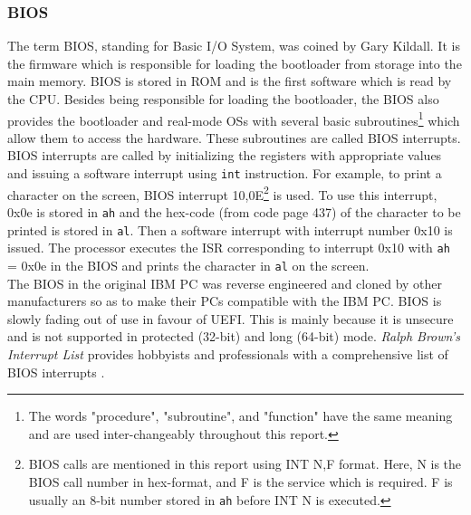 \subsubsection{BIOS}
The term BIOS, standing for Basic I/O System, was coined by Gary Kildall. It is the firmware which is responsible for loading the bootloader from storage into the main memory. BIOS is stored in ROM and is the first software which is read by the CPU. Besides being responsible for loading the bootloader, the BIOS also provides the bootloader and real-mode OSs with several basic subroutines\footnote[1]{The words "procedure", "subroutine", and "function" have the same meaning and are used inter-changeably throughout this report.} which allow them to access the hardware.  These subroutines are called BIOS interrupts. BIOS interrupts are called by initializing the registers with appropriate values and issuing a software interrupt using \verb|int| instruction. For example, to print a character on the screen, BIOS interrupt 10,0E\footnote[1]{BIOS calls are mentioned in this report using INT N,F format. Here, N is the BIOS call number in hex-format, and F is the service which is required. F is usually an 8-bit number stored in \texttt{ah} before INT N is executed.} is used. To use this interrupt, 0x0e is stored in \texttt{ah} and the hex-code (from code page 437) of the character to be printed is stored in \texttt{al}. Then a software interrupt with interrupt number 0x10 is issued. The processor executes the ISR corresponding to interrupt 0x10 with \texttt{ah} = 0x0e in the BIOS and prints the character in \texttt{al} on the screen.\\
The BIOS in the original IBM PC was reverse engineered and cloned by other manufacturers so as to make their PCs compatible with the IBM PC. BIOS is slowly fading out of use in favour of UEFI. This is mainly because it is unsecure and is not supported in protected (32-bit) and long (64-bit) mode. \textit{Ralph Brown's Interrupt List} provides hobbyists and professionals with a comprehensive list of BIOS interrupts \cite{ralphintlist}.

